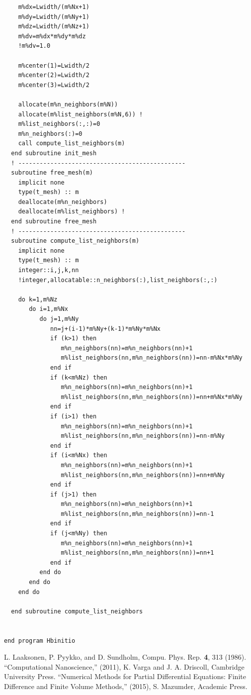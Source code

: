 \documentclass[11pt,a4paper]{article}
\begin{document}
\begin{verbatim}
    m%dx=Lwidth/(m%Nx+1)
    m%dy=Lwidth/(m%Ny+1)
    m%dz=Lwidth/(m%Nz+1)
    m%dv=m%dx*m%dy*m%dz
    !m%dv=1.0

    m%center(1)=Lwidth/2
    m%center(2)=Lwidth/2
    m%center(3)=Lwidth/2
    
    allocate(m%n_neighbors(m%N))
    allocate(m%list_neighbors(m%N,6)) !
    m%list_neighbors(:,:)=0
    m%n_neighbors(:)=0
    call compute_list_neighbors(m)
  end subroutine init_mesh
  ! -----------------------------------------------
  subroutine free_mesh(m)
    implicit none
    type(t_mesh) :: m
    deallocate(m%n_neighbors)
    deallocate(m%list_neighbors) !
  end subroutine free_mesh
  ! -----------------------------------------------
  subroutine compute_list_neighbors(m)
    implicit none
    type(t_mesh) :: m
    integer::i,j,k,nn
    !integer,allocatable::n_neighbors(:),list_neighbors(:,:)
    
    do k=1,m%Nz
       do i=1,m%Nx
          do j=1,m%Ny
             nn=j+(i-1)*m%Ny+(k-1)*m%Ny*m%Nx
             if (k>1) then 
                m%n_neighbors(nn)=m%n_neighbors(nn)+1
                m%list_neighbors(nn,m%n_neighbors(nn))=nn-m%Nx*m%Ny
             end if
             if (k<m%Nz) then 
                m%n_neighbors(nn)=m%n_neighbors(nn)+1
                m%list_neighbors(nn,m%n_neighbors(nn))=nn+m%Nx*m%Ny
             end if
             if (i>1) then 
                m%n_neighbors(nn)=m%n_neighbors(nn)+1
                m%list_neighbors(nn,m%n_neighbors(nn))=nn-m%Ny
             end if
             if (i<m%Nx) then 
                m%n_neighbors(nn)=m%n_neighbors(nn)+1
                m%list_neighbors(nn,m%n_neighbors(nn))=nn+m%Ny
             end if
             if (j>1) then 
                m%n_neighbors(nn)=m%n_neighbors(nn)+1
                m%list_neighbors(nn,m%n_neighbors(nn))=nn-1
             end if
             if (j<m%Ny) then 
                m%n_neighbors(nn)=m%n_neighbors(nn)+1
                m%list_neighbors(nn,m%n_neighbors(nn))=nn+1
             end if
          end do
       end do
    end do

  end subroutine compute_list_neighbors
  
  
end program Hbinitio
\end{verbatim}

\begin{thebibliography}{1}
 L. Laaksonen, P. Pyykko, and D. Sundholm, Compu. Phys. Rep. \textbf{4}, 313 (1986).
 ``Computational Nanoscience,'' (2011), K. Varga and J. A. Driscoll, Cambridge University Press.
 ``Numerical Methods for Partial Differential Equations: Finite Difference and Finite Volume Methods,'' (2015), S. Mazumder, Academic Press.
\end{thebibliography}
\end{document}
